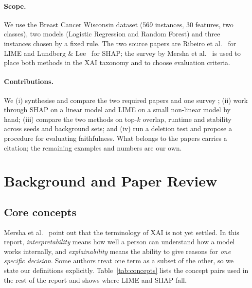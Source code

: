 \documentclass[11pt,a4paper]{article}
\begin{document}
\paragraph{Scope.} We use the Breast Cancer Wisconsin dataset \cite{street}
(569 instances, 30 features, two classes), two models (Logistic Regression and
Random Forest) and three instances chosen by a fixed rule. The two source
papers are Ribeiro et al.~\cite{ribeiro} for LIME and Lundberg \&
Lee~\cite{lundberg} for SHAP; the survey by Mersha et al.~\cite{mersha} is used
to place both methods in the XAI taxonomy and to choose evaluation criteria.

\paragraph{Contributions.} We (i) synthesise and compare the two required
papers \cite{ribeiro}\cite{lundberg} and one survey \cite{mersha}; (ii) work
through SHAP on a linear model and LIME on a small non-linear model by hand;
(iii) compare the two methods on top-$k$ overlap, runtime and stability across
seeds and background sets; and (iv) run a deletion test and propose a
procedure for evaluating faithfulness. What belongs to the papers carries a
citation; the remaining examples and numbers are our own.
\section{Background and Paper Review}

\subsection{Core concepts}
Mersha et al.~\cite{mersha} point out that the terminology of XAI is not yet
settled. In this report, \emph{interpretability} means how well a person can
understand how a model works internally, and \emph{explainability} means the
ability to give reasons for \emph{one specific decision}. Some authors treat one
term as a subset of the other, so we state our definitions explicitly.
Table~\ref{tab:concepts} lists the concept pairs used in the rest of the report
and shows where LIME and SHAP fall.
\end{document}
